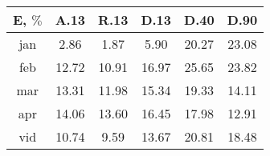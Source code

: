 \begin{tabular}{ | c | c c c c c | } \hline
E, $\%$	&A.13	&R.13	&D.13	&D.40	&D.90\\ \hline
jan	&2.86	&1.87	&5.90	&20.27	&23.08\\
feb	&12.72	&10.91	&16.97	&25.65	&23.82\\
mar	&13.31	&11.98	&15.34	&19.33	&14.11\\
apr	&14.06	&13.60	&16.45	&17.98	&12.91\\ \hline
vid	&10.74	&9.59	&13.67	&20.81	&18.48\\ \hline
\end{tabular}